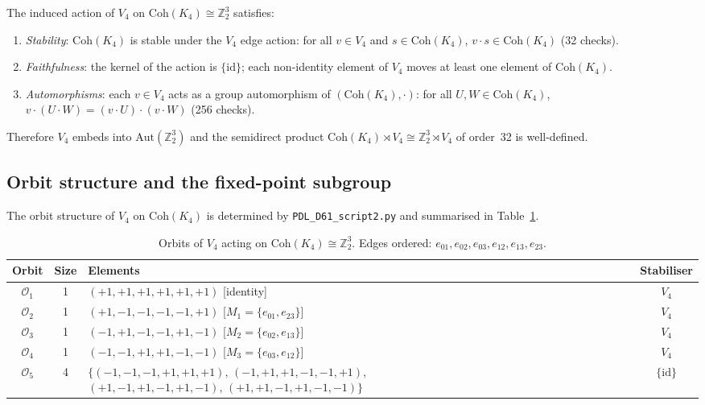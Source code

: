 \documentclass[11pt,a4paper]{article}
\newenvironment{theorembox}[1][]{%
  \begin{tcolorbox}[theoremstyle,title={Theorem%
    \ifx\relax#1\relax\else: #1\fi}]}{\end{tcolorbox}}
\theoremstyle{plain}
\theoremstyle{definition}
\theoremstyle{remark}
\newcommand{\Vfour}{V_4}
\newcommand{\Coh}{\mathrm{Coh}(K_4)}
\begin{document}
\begin{theorembox}[$\Vfour$ acts faithfully on $\Coh$ by automorphisms]
\label{thm:V4action}
The induced action of $\Vfour$ on $\Coh \cong \mathbb{Z}_2^3$ satisfies:
\begin{enumerate}[label=(\roman*)]
\item \emph{Stability}: $\Coh$ is stable under the $\Vfour$ edge action: for all
$v \in \Vfour$ and $s \in \Coh$, $v \cdot s \in \Coh$ (32 checks).
\item \emph{Faithfulness}: the kernel of the action is $\{\mathrm{id}\}$; each
non-identity element of $\Vfour$ moves at least one element of $\Coh$.
\item \emph{Automorphisms}: each $v \in \Vfour$ acts as a group automorphism of
$(\Coh, \cdot)$: for all $U, W \in \Coh$, $v \cdot (U \cdot W) = (v \cdot U) \cdot (v \cdot W)$ (256 checks).
\end{enumerate}
Therefore $\Vfour$ embeds into $\mathrm{Aut}(\mathbb{Z}_2^3)$ and the semidirect
product $\Coh \rtimes \Vfour \cong \mathbb{Z}_2^3 \rtimes \Vfour$ of order~32
is well-defined.
\end{theorembox}

\subsection{Orbit structure and the fixed-point subgroup}

The orbit structure of $\Vfour$ on $\Coh$ is determined by
\texttt{PDL\_D61\_script2.py} and summarised in Table~\ref{tab:orbits}.

\begin{table}[H]
\centering
\caption{Orbits of $\Vfour$ acting on $\Coh \cong \mathbb{Z}_2^3$.
Edges ordered: $e_{01}, e_{02}, e_{03}, e_{12}, e_{13}, e_{23}$.}
\label{tab:orbits}
\small
\renewcommand{\arraystretch}{1.3}
\begin{tabular}{ccp{7.5cm}c}
\toprule
Orbit & Size & Elements & Stabiliser \\
\midrule
$\mathcal{O}_1$ & 1 & $(+1,+1,+1,+1,+1,+1)$ [identity] & $\Vfour$ \\
$\mathcal{O}_2$ & 1 & $(+1,-1,-1,-1,-1,+1)$ [$M_1 = \{e_{01},e_{23}\}$] & $\Vfour$ \\
$\mathcal{O}_3$ & 1 & $(-1,+1,-1,-1,+1,-1)$ [$M_2 = \{e_{02},e_{13}\}$] & $\Vfour$ \\
$\mathcal{O}_4$ & 1 & $(-1,-1,+1,+1,-1,-1)$ [$M_3 = \{e_{03},e_{12}\}$] & $\Vfour$ \\
$\mathcal{O}_5$ & 4 & $\{(-1,-1,-1,+1,+1,+1),\,(-1,+1,+1,-1,-1,+1),$
                       $(+1,-1,+1,-1,+1,-1),\,(+1,+1,-1,+1,-1,-1)\}$ & $\{\mathrm{id}\}$ \\
\bottomrule
\end{tabular}
\end{table}
\end{document}
